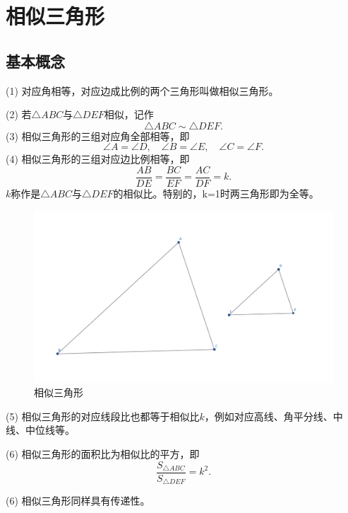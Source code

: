 \section{相似三角形}
\subsection{基本概念}
\begin{definition}[相似关系]
(1) 对应角相等，对应边成比例的两个三角形叫做相似三角形。

(2) 若$\triangle ABC$与$\triangle DEF$相似，记作
    $$\triangle ABC \sim \triangle DEF.$$
(3) 相似三角形的三组对应角全部相等，即
    $$\angle A = \angle D, \quad \angle B = \angle E, \quad \angle C = \angle F.$$
(4) 相似三角形的三组对应边比例相等，即
    $$\frac{AB}{DE} = \frac{BC}{EF} = \frac{AC}{DF}=k.$$
    $k$称作是$\triangle ABC$与$\triangle DEF$的相似比。特别的，k=1时两三角形即为全等。
\end{definition}

\begin{figure}[h]
    \centering
    \includegraphics[width=0.8\linewidth]{figures/相似三角形.png}
    \caption{相似三角形}
\end{figure}
\begin{proposition}
    (5) 相似三角形的对应线段比也都等于相似比$k$，例如对应高线、角平分线、中线、中位线等。
    
    (6) 相似三角形的面积比为相似比的平方，即
    $$\frac{S_{\triangle ABC}}{S_{\triangle DEF}} = k^2.$$
    
    (6) 相似三角形同样具有传递性。
\end{proposition}

